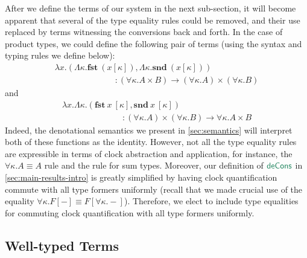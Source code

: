 \documentclass[natbib]{sigplanconf}
\newcommand{\elim}[1]{\textcolor{elim}{\textsf{#1}}}
\newcommand{\kw}[1]{\textbf{#1}}
\begin{document}
After we define the terms of our system in the next sub-section, it
will become apparent that several of the type equality rules could be
removed, and their use replaced by terms witnessing the conversions
back and forth. In the case of product types, we could define the
following pair of terms (using the syntax and typing rules we define
below):
\begin{displaymath}
  \begin{array}{l}
    \lambda x. (\Lambda \kappa. \mathbf{fst}~(x[\kappa]), \Lambda \kappa. \kw{snd}~(x[\kappa])) \\
    \hspace{3cm} : (\forall \kappa. A \times B) \to (\forall \kappa. A) \times (\forall \kappa. B)
  \end{array}
\end{displaymath}
and
\begin{displaymath}
  \begin{array}{l}
    \lambda x. \Lambda \kappa. (\kw{fst}~x~[\kappa], \kw{snd}~x~[\kappa]) \\
    \hspace{3cm} : (\forall \kappa. A) \times (\forall \kappa. B) \to \forall \kappa. A \times B
  \end{array}
\end{displaymath}
Indeed, the denotational semantics we present in
\autoref{sec:semantics} will interpret both of these functions as the
identity. However, not all the type equality rules are expressible in
terms of clock abstraction and application, for instance, the $\forall
\kappa. A \equiv A$ rule and the rule for sum types. Moreover, our
definition of $\elim{deCons}$ in \autoref{sec:main-results-intro} is
greatly simplified by having clock quantification commute with all
type formers uniformly (recall that we made crucial use of the
equality $\forall \kappa. F[-] \equiv F[\forall
\kappa. -]$). Therefore, we elect to include type equalities for
commuting clock quantification with all type formers uniformly.

\subsection{Well-typed Terms}
\label{sec:typed-terms}
\end{document}
